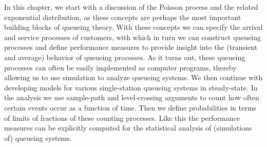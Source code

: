 In this chapter, we start with a discussion of the Poisson process and
the related exponential distribution, as these concepts are perhaps
the most important building blocks of queueing theory. With these
concepts we can specify the arrival and service processes of
customers, with which in turn we can construct queueing processes and
define performance measures to provide insight into the (transient and
average) behavior of queueing processes. As it turns out, these
queueing processes can often be easily implemented as computer
programs, thereby allowing us to use simulation to analyze queueing
systems. We then continue with developing models for various
single-station queueing systems in steady-state. In the analysis we
use sample-path and level-crossing arguments to count how often
certain events occur as a function of time. Then we define
probabilities in terms of limits of fractions of these counting
processes. Like this the performance measures can be explicitly
computed for the statistical analysis of (simulations of) queueing
systems.


